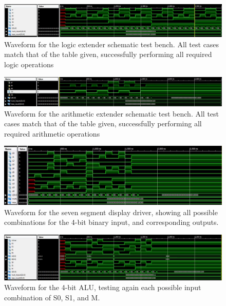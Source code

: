 \documentclass[12pt]{article}
\begin{document}

\begin{figure}[h]
    \centering
	\includegraphics[scale=.33]{logic_ext_tb_wave}
	\caption{Waveform for the logic extender schematic test bench. All test cases match that of the table given, successfully performing all required logic operations}
\end{figure}

\begin{figure}[h]
    \centering
	\includegraphics[scale=.33]{arith_ext_tb_wave.png}
	\caption{Waveform for the arithmetic extender schematic test bench. All test cases match that of the table given, successfully performing all required arithmetic operations}
\end{figure}

\begin{figure}[h]
    \centering
	\includegraphics[scale=.2]{seven_segment_tb_wave.png}
	\caption{Waveform for the seven segment display driver, showing all possible combinations for the 4-bit binary input, and corresponding outputs.}
\end{figure}

\begin{figure}[ht]
    \centering
	\includegraphics[scale=.33]{alu4bit_tb_wave.png}
	\caption{Waveform for the 4-bit ALU, testing again each possible input combination of S0, S1, and M.}
\end{figure}
\end{document}

